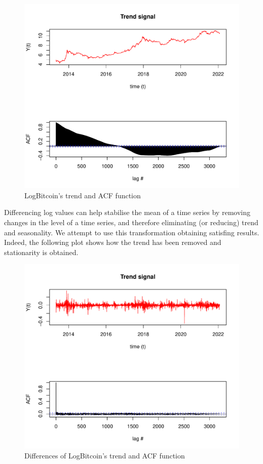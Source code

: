 \documentclass[
]{article}
\begin{document}
\begin{figure}
\centering
\includegraphics{Trial1_files/figure-latex/fig15-1.pdf}
\caption{\label{fig:fig15}LogBitcoin's trend and ACF function}
\end{figure}

Differencing log values can help stabilise the mean of a time series by
removing changes in the level of a time series, and therefore
eliminating (or reducing) trend and seasonality. We attempt to use this
transformation obtaining satisfing results. Indeed, the following plot
shows how the trend has been removed and stationarity is obtained.

\begin{figure}
\centering
\includegraphics{Trial1_files/figure-latex/fig16-1.pdf}
\caption{\label{fig:fig16}Differences of LogBitcoin's trend and ACF
function}
\end{figure}
\end{document}

